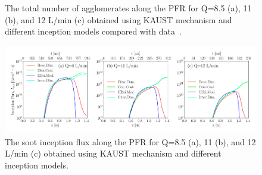 \begin{figure}[H]
	\centering
	\caption{The total number of agglomerates along the PFR for Q=8.5 (a), 11 (b), and 12 L/min (c) obtained using KAUST mechanism and different inception models compared with data~\citep{mei2019quantitative}.}
	\label{fig:pfr_Nagg} 
\end{figure}

\begin{figure}[H]
	\centering
	\includegraphics[width=1\textwidth]{Figures/Results/PFR/inception.pdf}
	\caption{The soot inception flux along the PFR for Q=8.5 (a), 11 (b), and 12 L/min (c) obtained using KAUST mechanism and different inception models.}
	\label{fig:pfr_Iinc} 
\end{figure}